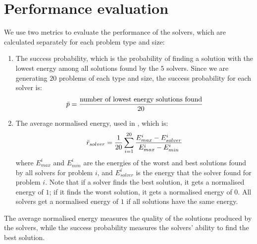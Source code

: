 

\section{Performance evaluation}
We use two metrics to evaluate the performance of the solvers, which are calculated separately for each problem type and size:
\begin{enumerate}
    \item The success probability, which is the probability of finding a solution with the lowest energy among all solutions found by the $5$ solvers. Since we are generating $20$ problems of each type and size, the success probability for each solver is:
    \begin{equation}
        \Bar{p} = \frac{\text{number of lowest energy solutions found}}{20}
    \end{equation}
    \item The average normalised energy, used in \cite{b34}, which is:
    \begin{equation}
        \Bar{r}_{solver} =  \frac{1}{20} \sum_{i = 1}^{20} \frac{E^i_{max} - E^i_{solver}}{E^i_{max} - E^i_{min}}
    \end{equation}
    where $E^i_{max}$ and $E^i_{min}$ are the energies of the worst and best solutions found by all solvers for problem $i$, and $E^i_{solver}$ is the energy that the solver found for problem $i$. Note that if a solver finds the best solution, it gets a normalised energy of $1$; if it finds the worst solution, it gets a normalised energy of $0$. All solvers get a normalised energy of $1$ if all solutions have the same energy.
\end{enumerate}
The average normalised energy measures the quality of the solutions produced by the solvers, while the success probability measures the solvers' ability to find the best solution.